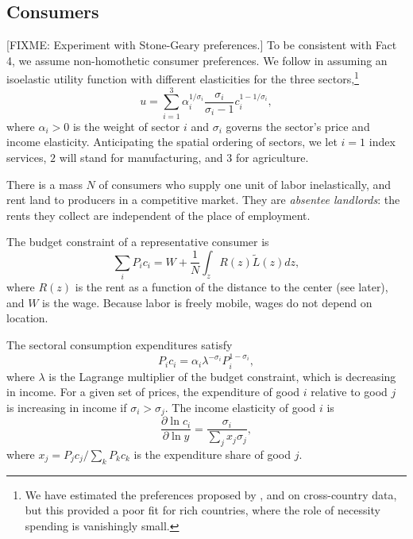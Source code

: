 \documentclass[12pt]{article}
\begin{document}
\subsection{Consumers}
[FIXME: Experiment with Stone-Geary preferences.]
To be consistent with Fact 4, we assume non-homothetic consumer preferences. We follow  in assuming an isoelastic utility function with different elasticities for the three sectors,\footnote{We have estimated the preferences proposed by ,  and  on cross-country data, but this provided a poor fit for rich countries, where the role of necessity spending is vanishingly small.}
\begin{equation}
\label{eq:Utility}
u = \sum_{i=1}^3\alpha_i^{1/\sigma_i}
	\frac {\sigma_i}
			{\sigma_i-1}
	c_i^{1-1/\sigma_i},
\end{equation}
where $\alpha_i>0$ is the weight of sector $i$ and $\sigma_i$ governs the sector's price and income elasticity. Anticipating the spatial ordering of sectors, we let $i=1$ index services, $2$ will stand for manufacturing, and $3$ for agriculture.

There is a mass $N$ of consumers who supply one unit of labor inelastically, and rent land to producers in a competitive market. They are \emph{absentee landlords}: the rents they collect are independent of the place of employment.

The budget constraint of a representative consumer is
\begin{equation}
\label{eq:BudCons}
\sum_i P_i c_i
	= W
	+ \frac 1N \int_z R(z)\tilde{L}(z)dz,
\end{equation}
where $R(z)$ is the rent as a function of the distance to the center (see later), and $W$ is the wage. Because labor is freely mobile, wages do not depend on location.

The sectoral consumption expenditures satisfy
\begin{equation}\label{eq:ConsShares}
{P_i c_i}
=
\alpha_i
\lambda^{ - \sigma_i}
{ P_i^{1-\sigma_i}},
\end{equation}
where $\lambda$ is the Lagrange multiplier of the budget constraint, which is decreasing in income. For a given set of prices, the expenditure of good $i$ relative to good $j$ is increasing in income if $\sigma_i>\sigma_j$.
The income elasticity of good $i$ is
\begin{equation}\label{eq:income_elasticity}
\frac 	{\partial \ln c_i}
		{\partial \ln y}
=
\frac 	{\sigma_i}
		{\sum_j x_j\sigma_j},
\end{equation}
where $x_j=P_jc_j/\sum_k P_kc_k$ is the expenditure share of good $j$.
\end{document}
